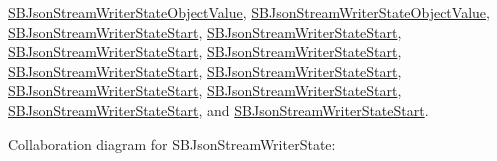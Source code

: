 \hyperlink{interface_s_b_json_stream_writer_state_object_value}{\-S\-B\-Json\-Stream\-Writer\-State\-Object\-Value}, \hyperlink{interface_s_b_json_stream_writer_state_object_value}{\-S\-B\-Json\-Stream\-Writer\-State\-Object\-Value}, \hyperlink{interface_s_b_json_stream_writer_state_start}{\-S\-B\-Json\-Stream\-Writer\-State\-Start}, \hyperlink{interface_s_b_json_stream_writer_state_start}{\-S\-B\-Json\-Stream\-Writer\-State\-Start}, \hyperlink{interface_s_b_json_stream_writer_state_start}{\-S\-B\-Json\-Stream\-Writer\-State\-Start}, \hyperlink{interface_s_b_json_stream_writer_state_start}{\-S\-B\-Json\-Stream\-Writer\-State\-Start}, \hyperlink{interface_s_b_json_stream_writer_state_start}{\-S\-B\-Json\-Stream\-Writer\-State\-Start}, \hyperlink{interface_s_b_json_stream_writer_state_start}{\-S\-B\-Json\-Stream\-Writer\-State\-Start}, \hyperlink{interface_s_b_json_stream_writer_state_start}{\-S\-B\-Json\-Stream\-Writer\-State\-Start}, \hyperlink{interface_s_b_json_stream_writer_state_start}{\-S\-B\-Json\-Stream\-Writer\-State\-Start}, \hyperlink{interface_s_b_json_stream_writer_state_start}{\-S\-B\-Json\-Stream\-Writer\-State\-Start}, and \hyperlink{interface_s_b_json_stream_writer_state_start}{\-S\-B\-Json\-Stream\-Writer\-State\-Start}.



\-Collaboration diagram for \-S\-B\-Json\-Stream\-Writer\-State\-:
